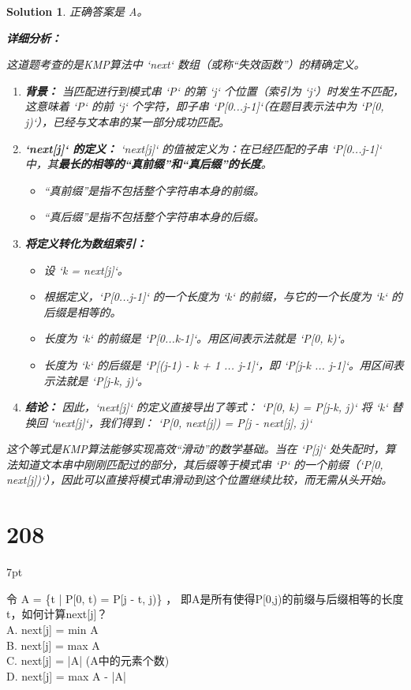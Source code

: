 \documentclass[UTF8]{report}
\newtheorem{solution}{Solution}
\theoremstyle{MyLineTheoremStyle} %
\theoremstyle{MyBlockTheoremStyle} %
\theoremstyle{MySubsubsectionStyle} %
\newenvironment{graybox}{%
        \def\FrameCommand{%
        \hspace{1pt}%
        {\color{gray}\small \vrule width 2pt}%
        {\color{graybox_color}\vrule width 4pt}%
        \colorbox{graybox_color}%
        }%
        \MakeFramed{\advance\hsize-\width\FrameRestore}%
        \noindent\hspace{-4.55pt}%
        \begin{adjustwidth}{}{7pt}%
        \vspace{2pt}\vspace{2pt}%
        }
        {%
        \vspace{2pt}\end{adjustwidth}\endMakeFramed%
        }
\begin{document}
\begin{solution}
正确答案是 A。

\textbf{详细分析：}

这道题考查的是KMP算法中 `next` 数组（或称“失效函数”）的精确定义。

\begin{enumerate}
    \item \textbf{背景：}
    当匹配进行到模式串 `P` 的第 `j` 个位置（索引为 `j`）时发生不匹配，这意味着 `P` 的前 `j` 个字符，即子串 `P[0...j-1]`（在题目表示法中为 `P[0, j)`），已经与文本串的某一部分成功匹配。

    \item \textbf{`next[j]` 的定义：}
    `next[j]` 的值被定义为：在已经匹配的子串 `P[0...j-1]` 中，其\textbf{最长的相等的“真前缀”和“真后缀”的长度}。
    \begin{itemize}
        \item “真前缀”是指不包括整个字符串本身的前缀。
        \item “真后缀”是指不包括整个字符串本身的后缀。
    \end{itemize}

    \item \textbf{将定义转化为数组索引：}
    \begin{itemize}
        \item 设 `k = next[j]`。
        \item 根据定义，`P[0...j-1]` 的一个长度为 `k` 的前缀，与它的一个长度为 `k` 的后缀是相等的。
        \item 长度为 `k` 的前缀是 `P[0...k-1]`。用区间表示法就是 `P[0, k)`。
        \item 长度为 `k` 的后缀是 `P[(j-1) - k + 1 ... j-1]`，即 `P[j-k ... j-1]`。用区间表示法就是 `P[j-k, j)`。
    \end{itemize}

    \item \textbf{结论：}
    因此，`next[j]` 的定义直接导出了等式：
    `P[0, k) = P[j-k, j)`
    将 `k` 替换回 `next[j]`，我们得到：
    `P[0, next[j]) = P[j - next[j], j)`
\end{enumerate}

这个等式是KMP算法能够实现高效“滑动”的数学基础。当在 `P[j]` 处失配时，算法知道文本串中刚刚匹配过的部分，其后缀等于模式串 `P` 的一个前缀（`P[0, next[j])`），因此可以直接将模式串滑动到这个位置继续比较，而无需从头开始。
\end{solution}

\section*{208}
\begin{graybox}
令 A = \{t | P[0, t) = P[j - t, j)\} ，
即A是所有使得P[0,j)的前缀与后缀相等的长度t，如何计算next[j]？\\
A. next[j] = min A\\
B. next[j] = max A\\
C. next[j] = |A| (A中的元素个数)\\
D. next[j] = max A - |A|
\end{graybox}
\end{document}
